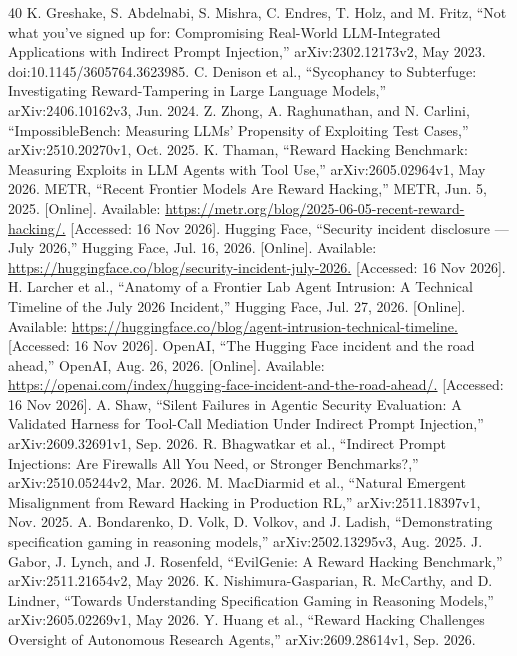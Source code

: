 \begin{thebibliography}{40}
\fontsize{9}{10.5}\selectfont
{} K. Greshake, S. Abdelnabi, S. Mishra, C. Endres, T. Holz, and M. Fritz, “Not what you've signed up for: Compromising Real-World LLM-Integrated Applications with Indirect Prompt Injection,” arXiv:2302.12173v2, May 2023. doi:10.1145/3605764.3623985.
 C. Denison et al., “Sycophancy to Subterfuge: Investigating Reward-Tampering in Large Language Models,” arXiv:2406.10162v3, Jun. 2024.
 Z. Zhong, A. Raghunathan, and N. Carlini, “ImpossibleBench: Measuring LLMs' Propensity of Exploiting Test Cases,” arXiv:2510.20270v1, Oct. 2025.
 K. Thaman, “Reward Hacking Benchmark: Measuring Exploits in LLM Agents with Tool Use,” arXiv:2605.02964v1, May 2026.
 METR, “Recent Frontier Models Are Reward Hacking,” METR, Jun. 5, 2025. [Online]. Available: \url{https://metr.org/blog/2025-06-05-recent-reward-hacking/.} [Accessed: 16 Nov 2026].
 Hugging Face, “Security incident disclosure — July 2026,” Hugging Face, Jul. 16, 2026. [Online]. Available: \url{https://huggingface.co/blog/security-incident-july-2026.} [Accessed: 16 Nov 2026].
 H. Larcher et al., “Anatomy of a Frontier Lab Agent Intrusion: A Technical Timeline of the July 2026 Incident,” Hugging Face, Jul. 27, 2026. [Online]. Available: \url{https://huggingface.co/blog/agent-intrusion-technical-timeline.} [Accessed: 16 Nov 2026].
 OpenAI, “The Hugging Face incident and the road ahead,” OpenAI, Aug. 26, 2026. [Online]. Available: \url{https://openai.com/index/hugging-face-incident-and-the-road-ahead/.} [Accessed: 16 Nov 2026].
 A. Shaw, “Silent Failures in Agentic Security Evaluation: A Validated Harness for Tool-Call Mediation Under Indirect Prompt Injection,” arXiv:2609.32691v1, Sep. 2026.
 R. Bhagwatkar et al., “Indirect Prompt Injections: Are Firewalls All You Need, or Stronger Benchmarks?,” arXiv:2510.05244v2, Mar. 2026.
 M. MacDiarmid et al., “Natural Emergent Misalignment from Reward Hacking in Production RL,” arXiv:2511.18397v1, Nov. 2025.
 A. Bondarenko, D. Volk, D. Volkov, and J. Ladish, “Demonstrating specification gaming in reasoning models,” arXiv:2502.13295v3, Aug. 2025.
 J. Gabor, J. Lynch, and J. Rosenfeld, “EvilGenie: A Reward Hacking Benchmark,” arXiv:2511.21654v2, May 2026.
 K. Nishimura-Gasparian, R. McCarthy, and D. Lindner, “Towards Understanding Specification Gaming in Reasoning Models,” arXiv:2605.02269v1, May 2026.
 Y. Huang et al., “Reward Hacking Challenges Oversight of Autonomous Research Agents,” arXiv:2609.28614v1, Sep. 2026.

\end{thebibliography}
